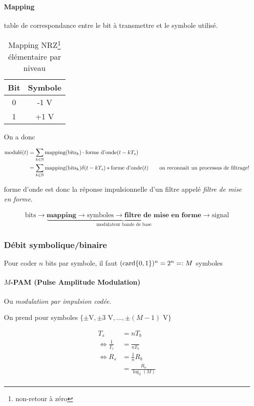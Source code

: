 \documentclass{article}
\begin{document}
\paragraph{Mapping} table de correspondance entre le bit à transmettre et le symbole utilisé.

\begin{table}[H]
	\centering
	\caption{Mapping NRZ\footnote{non-retour à zéro} élémentaire par niveau}
	\label{tab:mapping-élémentaire-niveau}
	\begin{tabular}{cc}
	Bit & Symbole \\\hline
	0 & -1 V \\
	1 & +1 V
	\end{tabular}
\end{table}

On a donc

\begin{align*}
	\text{modulé}(t) &= \sum_{k\in \mathbb{N}} \text{mapping}(\text{bits}_k) \cdot \text{forme d'onde}(t - k T_s)  \\
	&= \sum_{k\in \mathbb{N}} \text{mapping}(\text{bits}_k) \delta(t-kT_s) \ast \text{forme d'onde}(t) \quad&\text{on reconnaît un processus de filtrage!} \\
\end{align*}

$\text{forme d'onde}$ est donc la réponse impulsionnelle d'un filtre appelé \emph{filtre de mise en forme}.

\begin{align*}
	\text{bits} \to  \underbrace{\textbf{mapping} \to \text{symboles} \to \textbf{filtre de mise en forme} }_\text{modulateur bande de base} \to  \text{signal}
\end{align*}

\subsubsection{Débit symbolique/binaire}

Pour coder $n$ bits par symbole, il faut $(\operatorname{card} \{0, 1\})^n = 2^n =: M$ symboles

\paragraph{$M$-PAM (Pulse Amplitude Modulation)}
Ou \emph{modulation par impulsion codée}.

On prend pour symboles $\{\pm \text{V}, \pm 3 \text{ V}, \ldots, \pm (M-1) \text{ V}\} $ 

\begin{align*}
	T_s &= n T_b \\
	\iff \frac{1}{T_s} &= \frac{}{nT_b} \\
	\iff R_s &= \frac{1}{n} R_b \\
	&= \frac{R_b}{\log_2(M)} \\
\end{align*}
\end{document}
